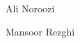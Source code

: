 \documentclass[journal]{IEEEtran}
\begin{document}
	\begin{IEEEbiography}{Ali Noroozi}
		
	\end{IEEEbiography}
	
	\begin{IEEEbiographynophoto}{Mansoor Rezghi}
		
	\end{IEEEbiographynophoto}
	
	
	
	
	
	
	
	
\end{document}
